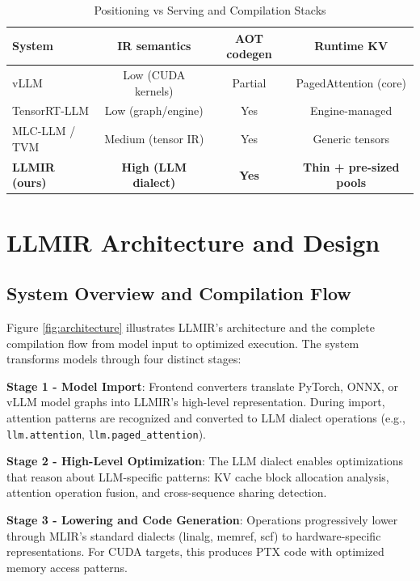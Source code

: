 \documentclass[conference]{IEEEtran}
\begin{document}
\begin{table}[htbp]
\caption{Positioning vs Serving and Compilation Stacks}
\begin{center}
\small
\begin{tabular}{|l|c|c|c|}
\hline
\textbf{System} & \textbf{IR semantics} & \textbf{AOT codegen} & \textbf{Runtime KV} \\
\hline
vLLM & Low (CUDA kernels) & Partial & PagedAttention (core) \\
\hline
TensorRT-LLM & Low (graph/engine) & Yes & Engine-managed \\
\hline
MLC-LLM / TVM & Medium (tensor IR) & Yes & Generic tensors \\
\hline
\textbf{LLMIR (ours)} & \textbf{High (LLM dialect)} & \textbf{Yes} & \textbf{Thin + pre-sized pools} \\
\hline
\end{tabular}
\label{tab:related_compare}
\end{center}
\end{table}

\section{LLMIR Architecture and Design}

\subsection{System Overview and Compilation Flow}

Figure \ref{fig:architecture} illustrates LLMIR's architecture and the complete compilation flow from model input to optimized execution. The system transforms models through four distinct stages:

\textbf{Stage 1 - Model Import}: Frontend converters translate PyTorch, ONNX, or vLLM model graphs into LLMIR's high-level representation. During import, attention patterns are recognized and converted to LLM dialect operations (e.g., \texttt{llm.attention}, \texttt{llm.paged\_attention}).

\textbf{Stage 2 - High-Level Optimization}: The LLM dialect enables optimizations that reason about LLM-specific patterns: KV cache block allocation analysis, attention operation fusion, and cross-sequence sharing detection.

\textbf{Stage 3 - Lowering and Code Generation}: Operations progressively lower through MLIR's standard dialects (linalg, memref, scf) to hardware-specific representations. For CUDA targets, this produces PTX code with optimized memory access patterns.
\end{document}
